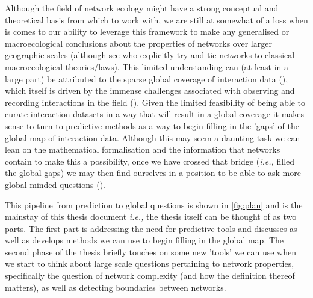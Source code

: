 \begin{refsection}
Although the field of network ecology might have a strong conceptual and
theoretical basis from which to work with, we are still at somewhat of a
loss when is comes to our ability to leverage this framework to make any
generalised or macroecological conclusions about the properties of networks
over larger geographic scales (although see \cite{Baiser2019EcoRul, Pinheiro2023Latitudinal} who explicitly try and tie networks to classical macroecological theories/laws). This limited understanding can (at least in a large part) be attributed to the sparse global coverage of interaction data (\cite{Poisot2021GloKno, Cameron2019Uneven}), which itself is driven by the immense challenges associated with observing and recording interactions in the field (\cite{Bennett2019PotPit, Jordano2016SamNet}). Given the limited feasibility of being able to curate interaction datasets in a way that will result in a global coverage it makes sense to turn to predictive methods as a way to begin filling in the 'gaps' of the global map of interaction data. Although this may seem a daunting task we can lean on the mathematical formalisation and the information that networks contain to make this a possibility, once we have crossed that bridge (\emph{i.e.,} filled the global gaps) we may then find ourselves in a position to be able to ask more global-minded questions (\cite{Windsor2023Using, ThuillerNavigating}).

This pipeline from prediction to global questions is shown in \autoref{fig:plan} and is the mainstay of this thesis document \emph{i.e.,} the thesis itself can be thought of as two parts. The first part is addressing the need for predictive tools and discusses as well as develops methods we can use to begin filling in the global map. The second phase of the thesis briefly touches on some new 'tools' we can use when we start to think about large scale questions pertaining to network properties, specifically the question of network complexity (and how the definition thereof matters), as well as detecting boundaries between networks.


\end{refsection}
